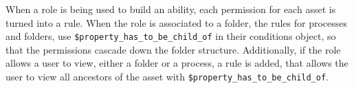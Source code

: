 When a role is being used to build an ability, each permission for each asset is turned into a
rule.
When the role is associated to a folder, the rules for processes and folders, use
\lstinline{$property_has_to_be_child_of} in their conditions object, so that the
permissions cascade down the folder structure.
Additionally, if the role allows a user to view, either a folder or a process, a rule is
added, that allows the user to view all ancestors of the asset with
\lstinline{$property_has_to_be_child_of}.


